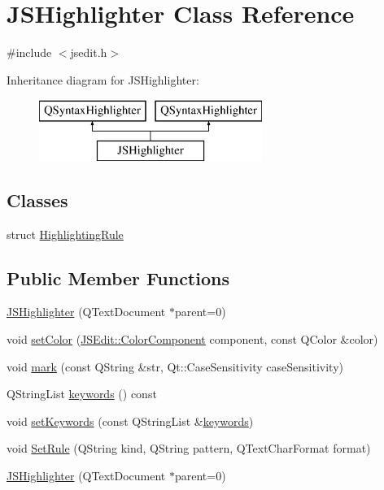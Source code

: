 \hypertarget{class_j_s_highlighter}{}\section{J\+S\+Highlighter Class Reference}
\label{class_j_s_highlighter}


{\ttfamily \#include $<$jsedit.\+h$>$}

Inheritance diagram for J\+S\+Highlighter\+:\begin{figure}[H]
\begin{center}
\leavevmode
\includegraphics[height=2.000000cm]{class_j_s_highlighter}
\end{center}
\end{figure}
\subsection*{Classes}
\begin{DoxyCompactItemize}
\item 
struct \hyperlink{struct_j_s_highlighter_1_1_highlighting_rule}{Highlighting\+Rule}
\end{DoxyCompactItemize}
\subsection*{Public Member Functions}
\begin{DoxyCompactItemize}
\item 
\hyperlink{class_j_s_highlighter_a0b110ce0492f6ac3c2310de65fcd7919}{J\+S\+Highlighter} (Q\+Text\+Document $\ast$parent=0)
\item 
void \hyperlink{class_j_s_highlighter_a19b04c73d5d10e9eb9bb0acccaa85886}{set\+Color} (\hyperlink{class_j_s_edit_a5a465193a1344e5be9b04f5ff7883213}{J\+S\+Edit\+::\+Color\+Component} component, const Q\+Color \&color)
\item 
void \hyperlink{class_j_s_highlighter_a3d552ad1d44a4192bff7ceac306b706e}{mark} (const Q\+String \&str, Qt\+::\+Case\+Sensitivity case\+Sensitivity)
\item 
Q\+String\+List \hyperlink{class_j_s_highlighter_af01421450f2260f630488f63a8912445}{keywords} () const
\item 
void \hyperlink{class_j_s_highlighter_ad8409e0cec9cd61dd4667c2e5b714c12}{set\+Keywords} (const Q\+String\+List \&\hyperlink{class_j_s_highlighter_af01421450f2260f630488f63a8912445}{keywords})
\item 
void \hyperlink{class_j_s_highlighter_aab4501a701fd36da2510f3bd26422e7a}{Set\+Rule} (Q\+String kind, Q\+String pattern, Q\+Text\+Char\+Format format)
\item 
\hyperlink{class_j_s_highlighter_a0b110ce0492f6ac3c2310de65fcd7919}{J\+S\+Highlighter} (Q\+Text\+Document $\ast$parent=0)
\end{DoxyCompactItemize}
